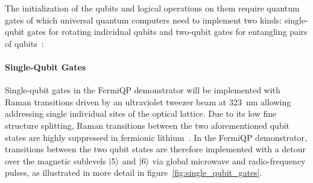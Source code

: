 The initialization of the qubits and logical operations on them require quantum gates of which universal quantum computers need to implement two kinds: single-qubit gates for rotating individual qubits and two-qubit gates for entangling pairs of qubits~\cite{nielsen_quantum_2010, hidary_quantum_2021, ladd_quantum_2010, mainzer_quantencomputer_2020}:

\paragraph*{Single-Qubit Gates}
Single-qubit gates in the FermiQP demonstrator will be implemented with Raman transitions driven by an ultraviolet tweezer beam at \SI[]{323}{\nano\meter} allowing addressing single individual sites of the optical lattice. Due to its low fine structure splitting, Raman transitions between the two aforementioned qubit states are highly suppressed in  fermionic lithium~\cite{wei_magnetic-field_2013}. In the FermiQP demonstrator, transitions between the two qubit states are therefore implemented with a detour over the magnetic sublevels $\Ket{5}$ and $\Ket{6}$ via global microwave and radio-frequency pulses, as illustrated in more detail in figure~\ref{fig:single_qubit_gates}.

